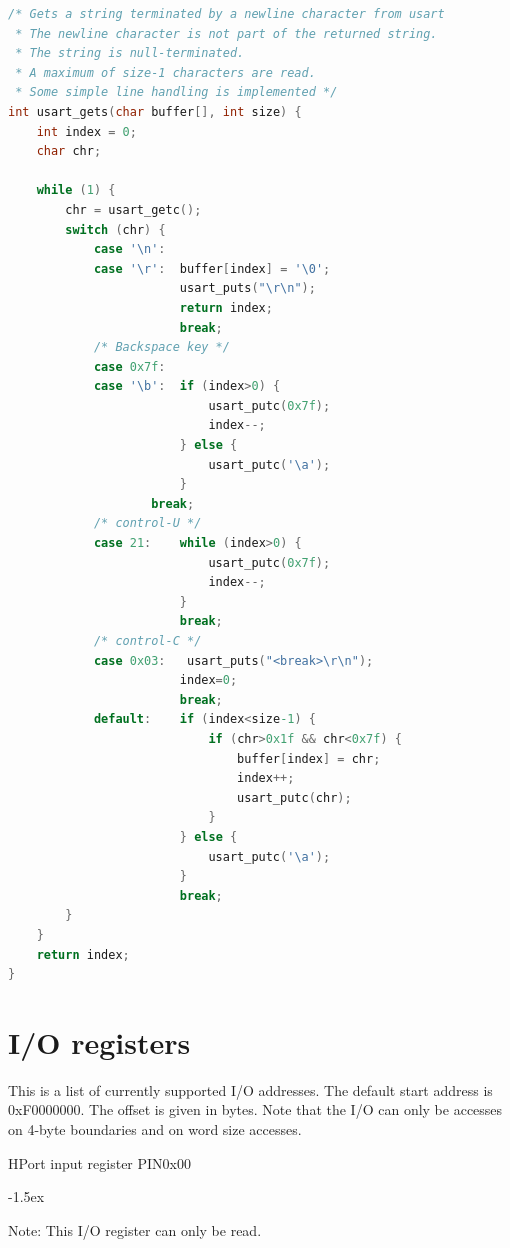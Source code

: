 \documentclass[12pt]{article}
\begin{document}
\begin{lstlisting}[language=C]
/* Gets a string terminated by a newline character from usart
 * The newline character is not part of the returned string.
 * The string is null-terminated.
 * A maximum of size-1 characters are read.
 * Some simple line handling is implemented */
int usart_gets(char buffer[], int size) {
    int index = 0;
    char chr;

    while (1) {
        chr = usart_getc();
        switch (chr) {
            case '\n':
            case '\r':  buffer[index] = '\0';
                        usart_puts("\r\n");
                        return index;
                        break;
            /* Backspace key */
            case 0x7f:
            case '\b':  if (index>0) {
                            usart_putc(0x7f);
                            index--;
                        } else {
                            usart_putc('\a');
                        }
                    break;
            /* control-U */
            case 21:    while (index>0) {
                            usart_putc(0x7f);
                            index--;
                        }
                        break;
            /* control-C */
            case 0x03:   usart_puts("<break>\r\n");
                        index=0;
                        break;
            default:    if (index<size-1) {
                            if (chr>0x1f && chr<0x7f) {
                                buffer[index] = chr;
                                index++;
                                usart_putc(chr);
                            }
                        } else {
                            usart_putc('\a');
                        }
                        break;
        }
    }
    return index;
}
\end{lstlisting}

\section{I/O registers}
\label{sec:ioregisters}
This is a list of currently supported I/O addresses. 
The default start address is 0xF0000000. The offset is given in bytes. Note that the I/O can only be accesses on 4-byte boundaries and on word size accesses.

\begin{register}{H}{Port input register PIN}{0x00}%
\label{pinx}%
\regnewline%
\end{register}
\begin{regdesc}[0.6\textwidth]\begin{reglist}[000000000]
\itemsep-1.5ex
\item[Note:] This I/O register can only be read.
\end{reglist}\end{regdesc}
\end{document}
